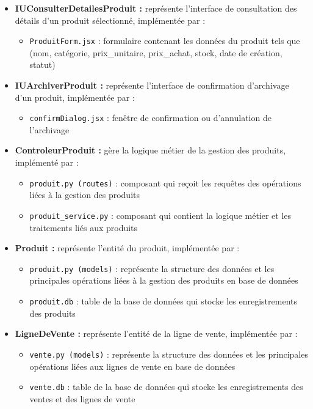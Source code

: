 \begin{itemize}[leftmargin=2em, topsep=4pt, itemsep=4pt]
  \begin{itemize}[leftmargin=2em, topsep=2pt, itemsep=2pt]
    \item \texttt{confirmDialog.jsx} : fenêtre qui propose l'archivage si le produit est lié à une vente ou confirme la suppression définitive
  \end{itemize}
  \item \textbf{IUConsulterDetailesProduit :} représente l'interface de consultation des détails d'un produit sélectionné, implémentée par :
  \begin{itemize}[leftmargin=2em, topsep=2pt, itemsep=2pt]
    \item \texttt{ProduitForm.jsx} : formulaire contenant les données du produit tels que (nom, catégorie, prix\_unitaire, prix\_achat, stock, date de création, statut)
  \end{itemize}
  \item \textbf{IUArchiverProduit :} représente l'interface de confirmation d'archivage d'un produit, implémentée par :
  \begin{itemize}[leftmargin=2em, topsep=2pt, itemsep=2pt]
    \item \texttt{confirmDialog.jsx} : fenêtre de confirmation ou d'annulation de l'archivage
  \end{itemize}
  \item \textbf{ControleurProduit :} gère la logique métier de la gestion des produits, implémenté par :
  \begin{itemize}[leftmargin=2em, topsep=2pt, itemsep=2pt]
    \item \texttt{produit.py (routes)} : composant qui reçoit les requêtes des opérations liées à la gestion des produits
    \item \texttt{produit\_service.py} : composant qui contient la logique métier et les traitements liés aux produits
  \end{itemize}
  \item \textbf{Produit :} représente l'entité du produit, implémentée par :
  \begin{itemize}[leftmargin=2em, topsep=2pt, itemsep=2pt]
    \item \texttt{produit.py (models)} : représente la structure des données et les principales opérations liées à la gestion des produits en base de données
    \item \texttt{produit.db} : table de la base de données qui stocke les enregistrements des produits
  \end{itemize}
  \item \textbf{LigneDeVente :} représente l'entité de la ligne de vente, implémentée par :
  \begin{itemize}[leftmargin=2em, topsep=2pt, itemsep=2pt]
    \item \texttt{vente.py (models)} : représente la structure des données et les principales opérations liées aux lignes de vente en base de données
    \item \texttt{vente.db} : table de la base de données qui stocke les enregistrements des ventes et des lignes de vente
  \end{itemize}
\end{itemize}
\newpage
